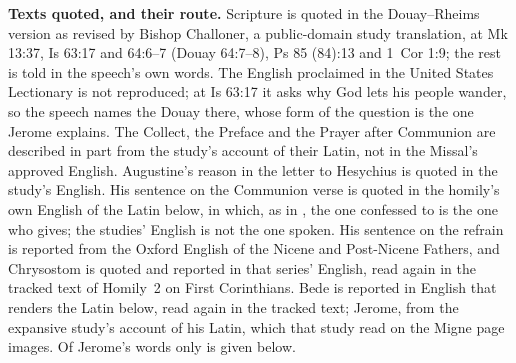{\textbf{Texts quoted, and their route.} Scripture is quoted in the
Douay--Rheims version as revised by Bishop Challoner, a public-domain study
translation, at Mk 13:37, Is 63:17 and 64:6--7 (Douay 64:7--8), Ps 85
(84):13 and 1~Cor 1:9; the rest is told in the speech's own words. The
English proclaimed in the United States Lectionary is not reproduced; at Is
63:17 it asks why God lets his people wander, so the speech names the Douay
there, whose form of the question is the one Jerome explains. The Collect,
the Preface and the Prayer after Communion are described in part from the
study's account of their Latin, not in the Missal's approved English.
Augustine's reason in the letter to Hesychius is quoted in the study's
English. His sentence on the Communion verse is quoted in the homily's own
English of the Latin below, in which, as in , the one confessed to is the one who gives; the studies' English
is not the one spoken. His sentence on the refrain is reported from the
Oxford English of the Nicene and Post-Nicene Fathers, and Chrysostom is
quoted and reported in that series' English, read again in the tracked text
of Homily~2 on First Corinthians. Bede is reported in English that renders
the Latin below, read again in the tracked text; Jerome, from the expansive
study's account of his Latin, which that study read on the Migne page images.
Of Jerome's words only  is given below.

}

